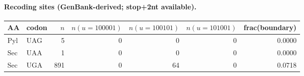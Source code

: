 \paragraph{Recoding sites (GenBank-derived; stop+2nt available).}
\begin{center}
\small
\setlength{\tabcolsep}{6pt}
\renewcommand{\arraystretch}{1.15}
\begin{tabular}{l l r r r r r}
\toprule
AA & codon & $n$ & $n(u=100001)$ & $n(u=100101)$ & $n(u=101001)$ & frac(boundary) \\
\midrule
Pyl & UAG & 5 & 0 & 0 & 0 & 0.0000 \\
Sec & UAA & 1 & 0 & 0 & 0 & 0.0000 \\
Sec & UGA & 891 & 0 & 64 & 0 & 0.0718 \\
\bottomrule
\end{tabular}
\end{center}

